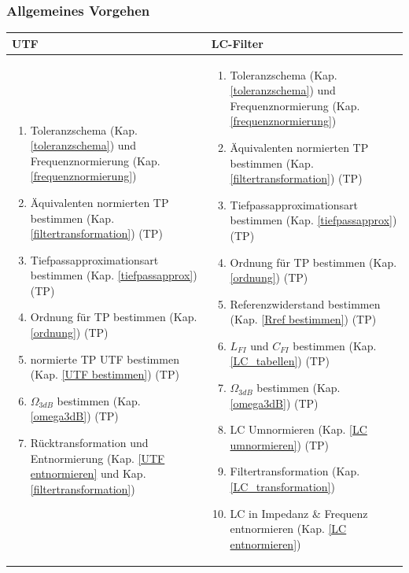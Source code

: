 \subsubsection{Allgemeines Vorgehen}
\begin{tabular}{p{9cm}|p{9cm}}
    \textbf{UTF} &
    \textbf{LC-Filter} \\
  \hline
    \begin{enumerate}
      \item Toleranzschema (Kap. \ref{toleranzschema}) und Frequenznormierung (Kap. \ref{frequenznormierung})
      \item Äquivalenten normierten TP bestimmen (Kap. \ref{filtertransformation}) (TP)
      \item Tiefpassapproximationsart bestimmen (Kap. \ref{tiefpassapprox}) (TP)
      \item Ordnung für TP bestimmen (Kap. \ref{ordnung}) (TP)
      \item normierte TP UTF bestimmen (Kap. \ref{UTF bestimmen}) (TP)
      \item $\Omega_{3dB}$ bestimmen (Kap. \ref{omega3dB}) (TP)
      \item Rücktransformation und Entnormierung (Kap. \ref{UTF entnormieren} und Kap. \ref{filtertransformation})
    \end{enumerate} &
    \begin{enumerate}
      \item Toleranzschema (Kap. \ref{toleranzschema}) und Frequenznormierung (Kap. \ref{frequenznormierung})
      \item Äquivalenten normierten TP bestimmen (Kap. \ref{filtertransformation}) (TP)
      \item Tiefpassapproximationsart bestimmen (Kap. \ref{tiefpassapprox}) (TP)
      \item Ordnung für TP bestimmen (Kap. \ref{ordnung}) (TP)
      \item Referenzwiderstand bestimmen (Kap. \ref{Rref bestimmen}) (TP)
      \item $L_{FI}$ und $C_{FI}$ bestimmen (Kap. \ref{LC_tabellen}) (TP)
      \item $\Omega_{3dB}$ bestimmen (Kap. \ref{omega3dB}) (TP)
      \item LC Umnormieren (Kap. \ref{LC umnormieren}) (TP)
      \item Filtertransformation (Kap. \ref{LC_transformation})
      \item LC in Impedanz \& Frequenz entnormieren (Kap. \ref{LC entnormieren})
    \end{enumerate}
\end{tabular}


